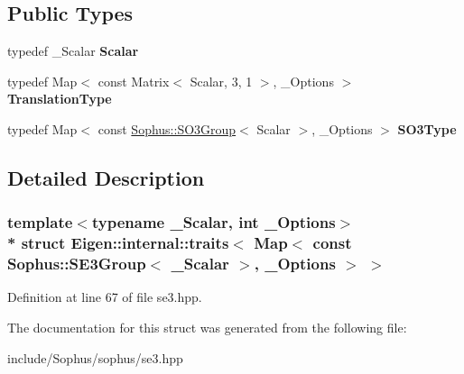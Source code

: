 \subsection*{Public Types}
\begin{DoxyCompactItemize}
\item 
typedef \+\_\+\+Scalar {\bfseries Scalar}\hypertarget{struct_eigen_1_1internal_1_1traits_3_01_map_3_01const_01_sophus_1_1_s_e3_group_3_01___scalar_01_4_00_01___options_01_4_01_4_a72eaf51cd2fb5a1b7f6bd76aa5ff4920}{}\label{struct_eigen_1_1internal_1_1traits_3_01_map_3_01const_01_sophus_1_1_s_e3_group_3_01___scalar_01_4_00_01___options_01_4_01_4_a72eaf51cd2fb5a1b7f6bd76aa5ff4920}

\item 
typedef Map$<$ const Matrix$<$ Scalar, 3, 1 $>$, \+\_\+\+Options $>$ {\bfseries Translation\+Type}\hypertarget{struct_eigen_1_1internal_1_1traits_3_01_map_3_01const_01_sophus_1_1_s_e3_group_3_01___scalar_01_4_00_01___options_01_4_01_4_a35acc715bfb4969eb792bee9a8bc679b}{}\label{struct_eigen_1_1internal_1_1traits_3_01_map_3_01const_01_sophus_1_1_s_e3_group_3_01___scalar_01_4_00_01___options_01_4_01_4_a35acc715bfb4969eb792bee9a8bc679b}

\item 
typedef Map$<$ const \hyperlink{class_sophus_1_1_s_o3_group}{Sophus\+::\+S\+O3\+Group}$<$ Scalar $>$, \+\_\+\+Options $>$ {\bfseries S\+O3\+Type}\hypertarget{struct_eigen_1_1internal_1_1traits_3_01_map_3_01const_01_sophus_1_1_s_e3_group_3_01___scalar_01_4_00_01___options_01_4_01_4_ae29eef04d53060702010684a505065d7}{}\label{struct_eigen_1_1internal_1_1traits_3_01_map_3_01const_01_sophus_1_1_s_e3_group_3_01___scalar_01_4_00_01___options_01_4_01_4_ae29eef04d53060702010684a505065d7}

\end{DoxyCompactItemize}


\subsection{Detailed Description}
\subsubsection*{template$<$typename \+\_\+\+Scalar, int \+\_\+\+Options$>$\\*
struct Eigen\+::internal\+::traits$<$ Map$<$ const Sophus\+::\+S\+E3\+Group$<$ \+\_\+\+Scalar $>$, \+\_\+\+Options $>$ $>$}



Definition at line 67 of file se3.\+hpp.



The documentation for this struct was generated from the following file\+:\begin{DoxyCompactItemize}
\item 
include/\+Sophus/sophus/se3.\+hpp\end{DoxyCompactItemize}
